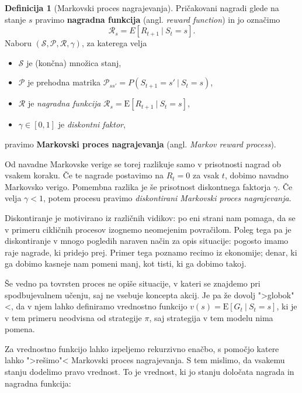 \documentclass[12pt,a4paper]{amsart}
\theoremstyle{definition} %
\newtheorem{definicija}{Definicija}[section]
\theoremstyle{plain} %
\begin{document}
\begin{definicija}[Markovski proces nagrajevanja]
    Pričakovani nagradi glede na stanje $s$ pravimo \textbf{nagradna funkcija} (angl. \textit{reward 
    function}) in jo označimo
    $$
    \mathcal{R}_s = E[R_{t+1}~|~S_{t} = s].
    $$
    Naboru $(\mathcal{S}, \mathcal{P}, \mathcal{R}, \gamma)$, za katerega velja
    \begin{itemize}
        \item $\mathcal{S}$ je (končna) množica stanj,
        \item $\mathcal{P}$ je prehodna matrika $\mathcal{P}_{ss'} = P(S_{t+1} = s'~|~S_{t} = s)$, 
        \item $\mathcal{R}$ je \textit{nagradna funkcija} 
                $\mathcal{R}_s = \mathrm{E}[R_{t+1}~|~S_{t} = s]$, 
        \item $\gamma \in [0,1]$ je \textit{diskontni faktor}, 
    \end{itemize}
    pravimo \textbf{Markovski proces nagrajevanja} (angl. \textit{Markov reward process}).
\end{definicija}

Od navadne Markovske verige se torej razlikuje samo v prisotnosti nagrad ob vsakem koraku. Če te 
nagrade postavimo na $R_t = 0$ za vsak $t$, dobimo navadno Markovsko verigo. Pomembna razlika je še 
prisotnost diskontnega faktorja $\gamma$. Če velja $\gamma < 1$, potem procesu pravimo \textit{
diskontirani Markovski proces nagrajevanja}.

Diskontiranje je motivirano iz različnih vidikov: po eni strani nam pomaga, da se v primeru 
cikličnih procesov izognemo neomejenim povračilom. Poleg tega pa je diskontiranje v mnogo pogledih 
naraven način za opis situacije: pogosto imamo raje nagrade, ki pridejo prej. Primer tega poznamo 
recimo iz ekonomije; denar, ki ga dobimo kasneje nam pomeni manj, kot tisti, ki ga dobimo takoj. 

Še vedno pa tovrsten proces ne opiše situacije, v kateri se znajdemo pri spodbujevalnem učenju, saj 
ne vsebuje koncepta akcij. Je pa že dovolj ">globok"<, da v njem lahko definiramo vrednostno 
funkcijo $v(s) = \mathrm{E} [G_t~|~S_t = s]$, ki je v tem primeru neodvisna od strategije $\pi$, 
saj strategija v tem modelu nima pomena. 

Za vrednostno funkcijo lahko izpeljemo rekurzivno enačbo, s pomočjo katere lahko ">rešimo"< Markovski
proces nagrajevanja. S tem mislimo, da vsakemu stanju dodelimo pravo vrednost. To je vrednost, ki jo 
stanju določata nagrada in nagradna funkcija:
\end{document}
